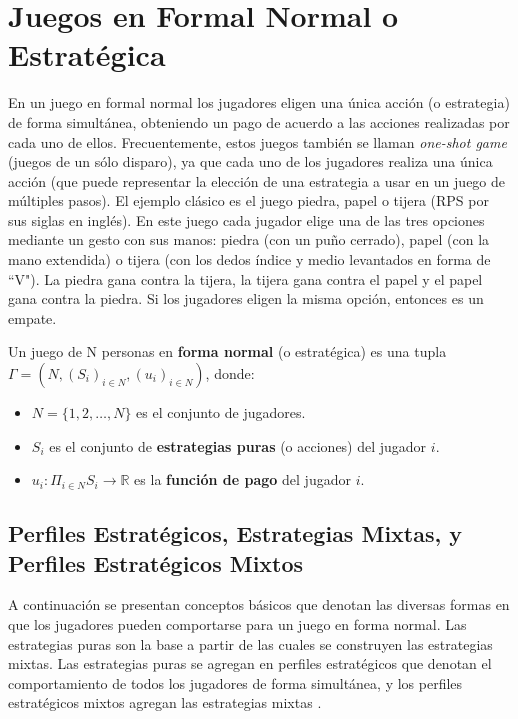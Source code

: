 \chapter{Juegos en Formal Normal o Estratégica}
\label{chapter:forma-normal}

En un juego en formal normal los jugadores eligen una única acción (o estrategia) de forma simultánea, obteniendo un pago de acuerdo a las acciones realizadas por cada uno de ellos. Frecuentemente, estos juegos también se llaman \textit{one-shot game} (juegos de un sólo disparo), ya que cada uno de los jugadores realiza una única acción \cite{bib:introductionCFR} (que puede representar la elección de una estrategia a usar en un juego de múltiples pasos). El ejemplo clásico es el juego piedra, papel o tijera (RPS por sus siglas en inglés). En este juego cada jugador elige una de las tres opciones mediante un gesto con sus manos: piedra (con un puño cerrado), papel (con la mano extendida) o tijera (con los dedos índice y medio levantados en forma de ``V"). La piedra gana contra la tijera, la tijera gana contra el papel y el papel gana contra la piedra. Si los jugadores eligen la misma opción, entonces es un empate.

\begin{definition}
\label{def:forma-normal}
Un juego de N personas en \textbf{forma normal} (o estratégica) es una tupla $\Gamma = (N, (S_i)_{i \in N}, (u_i)_{i \in N})$, donde:
	\begin{itemize}[]
		\item $N = \{1, 2, \dots, N\}$ es el conjunto de jugadores.
		\item  $S_i$ es el conjunto de \textbf{estrategias puras} (o acciones) del jugador $i$.
		\item $u_i : \Pi _{i \in N} S_i \rightarrow \mathbb{R}$ es la \textbf{función de pago} del jugador $i$.
	\end{itemize}
\end{definition}

\section{Perfiles Estratégicos, Estrategias Mixtas, y Perfiles Estratégicos Mixtos}
A continuación se presentan conceptos básicos que denotan las diversas formas en que los jugadores pueden comportarse para un juego en forma normal. Las estrategias puras son la base a partir de las cuales se construyen las estrategias mixtas. Las estrategias puras se agregan en perfiles estratégicos que denotan el comportamiento de todos los jugadores de forma simultánea, y los perfiles estratégicos mixtos agregan las estrategias mixtas \cite{bib:tutorial-existence-nash}.

